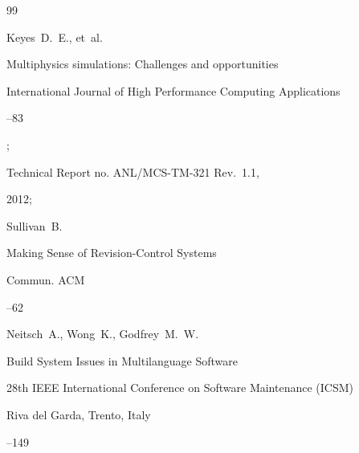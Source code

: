 \begin{thebibliography}{99}




\by Keyes~D.~E., et~al.

\paper   Multiphysics simulations: Challenges and opportunities


\jour International Journal of High Performance Computing Applications 



--83 

;



Technical Report no. ANL/MCS-TM-321 Rev.~1.1,


2012;









\by Sullivan~B.

\paper Making Sense of Revision-Control Systems


\jour Commun. ACM




--62






\by Neitsch~A., Wong~K., Godfrey~M.~W.


\paper Build System Issues in   Multilanguage Software

\inbook  28th IEEE International Conference on Software Maintenance (ICSM)


\publaddr Riva del Garda, Trento, Italy

--149






\end{thebibliography}
